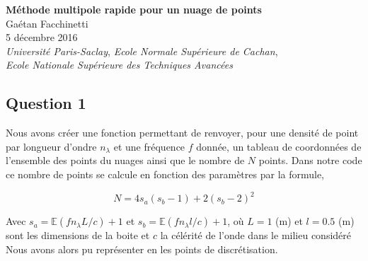 \documentclass[10pt]{article}
\begin{document}
\begin{center}
\textbf{\Large Méthode multipole rapide pour un nuage de points}\\
\vspace*{4pt}
Gaétan Facchinetti \\
{\small 5 décembre 2016\\
\vspace*{5pt}
\textit{Université Paris-Saclay}, \textit{Ecole Normale Supérieure de Cachan}}, \\
\textit{Ecole Nationale Supérieure des Techniques Avancées}\\
\end{center}

\vspace*{22pt}


\begin{multicols}{2}



\section*{Question 1}

Nous avons créer une fonction permettant de renvoyer, pour une densité de point par longueur d'ondre $n_\lambda$ et une fréquence $f$ donnée, un tableau de coordonnées de l'ensemble des points du nuages ainsi que le nombre de $N$ points. Dans notre code ce nombre de points se calcule en fonction des paramètres par la formule, 

\begin{equation}
N = 4s_a(s_b-1) + 2(s_b-2)^{2}
\label{eq:N}
\end{equation}

Avec $s_a = \mathbb{E}(f n_\lambda L/c)+1$ et $s_b = \mathbb{E}(f n_\lambda l/c)+1$, où $L=1$ (m) et $l=0.5$ (m) sont les dimensions de la boite et $c$ la célérité de l'onde dans le milieu considéré Nous avons alors pu représenter en  les points de discrétisation.



\end{multicols}
\end{document}
